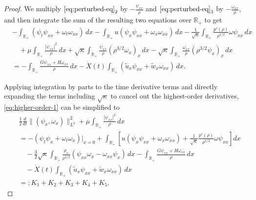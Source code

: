 \documentclass[11pt,reqno]{amsart}
\numberwithin{equation}{section} %
\begin{document}
\begin{proof} We multiply $\eqref{eq:perturbed-eq}_2$ by $-\frac{\psi_{xx}}{\rho}$ and $\eqref{eq:perturbed-eq}_3$ by $-\frac{\omega_{xx}}{\rho}$, and then integrate the sum of the resulting two equations over $\mathbb{R}_+$ to get
\begin{equation}\label{eq:higher-order-1}
\begin{aligned}
    &-\int_{\mathbb{R}_+} (\psi_t \psi_{xx} + \omega_t \omega_{xx}) \,dx - \int_{\mathbb{R}_+} u (\psi_x \psi_{xx} + \omega_x \omega_{xx}) \,dx - \frac{1}{\sqrt{\kappa}}\int_{\mathbb{R}_+} \frac{p'(\rho)}{\rho^{1/2}} \omega \psi_{xx} \,dx \\
    &\quad + \mu \int_{\mathbb{R}_+} \frac{|\psi_{xx}|^2}{\rho}  \,dx + \sqrt{\kappa} \int_{\mathbb{R}_+} \frac{\psi_{xx}}{\rho} (\rho^{3/2} \omega_x)_x \,dx - \sqrt{\kappa} \int_{\mathbb{R}_+} \frac{\omega_{xx}}{\rho} (\rho^{3/2} \psi_x)_x \,dx \\
    &=- \int_{\mathbb{R}_+} \frac{G\psi_{xx} + H\omega_{xx}}{\rho} \,dx  - \dot{X}(t) \int_{\mathbb{R}_+} (\tilde{u}_x \psi_{xx} + \tilde{w}_x \omega_{xx}) \,dx.
\end{aligned}
\end{equation}

Applying integration by parts to the time derivative terms and directly expanding the terms including $\sqrt{\kappa}$ to cancel out the highest-order derivatives, \eqref{eq:higher-order-1} can be simplified to
\begin{equation*}%
\begin{aligned}
    &\frac{1}{2} \frac{d}{dt} \|(\psi_x, \omega_x)\|_{L^2}^2 + \mu \int_{\mathbb{R}_+} \frac{|\psi_{xx}|^2}{\rho}  \,dx \\
    &= -(\psi_t \psi_x + \omega_t \omega_x)|_{x=0}   + \int_{\mathbb{R}_+} \left[u (\psi_x \psi_{xx} + \omega_x \omega_{xx}) +\frac{1}{\sqrt{\kappa}}\frac{p'(\rho)}{\rho^{1/2}} \omega \psi_{xx} \right] dx \\
    &\quad - \frac{3}{2}\sqrt{\kappa} \int_{\mathbb{R}_+} \frac{\rho_x}{\rho^{1/2}} (\psi_{xx} \omega_x - \omega_{xx} \psi_x) \,dx - \int_{\mathbb{R}_+} \frac{G\psi_{xx} + H\omega_{xx}}{\rho} \,dx \\
    &\quad - \dot{X}(t) \int_{\mathbb{R}_+} (\tilde{u}_x \psi_{xx} + \tilde{w}_x \omega_{xx}) \,dx \\
    &=: K_1 + K_2 + K_3 + K_4 + K_5.
\end{aligned}
\end{equation*}


\end{proof}
\end{document}
